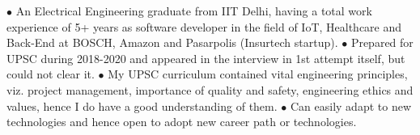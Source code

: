 \documentclass[9pt]{developercv} %
\begin{document}
\vspace{0.5cm}



\begin{minipage}[t]{0.6\textwidth} %
	\vspace{-\baselineskip} %
	
	 $\bullet$ An Electrical Engineering graduate from IIT Delhi, having a total work experience of 5+ years as software developer in the field of IoT, Healthcare and Back-End at BOSCH, Amazon and Pasarpolis (Insurtech startup). $\bullet$ Prepared for UPSC during 2018-2020 and appeared in the interview in 1st attempt itself, but could not clear it. $\bullet$ My UPSC curriculum contained vital engineering principles, viz. project management, importance of quality and safety, engineering ethics and values, hence I do have a good understanding of them. $\bullet$ Can easily adapt to new technologies and hence open to adopt new career path or technologies.\\ %
\end{minipage}
\hfill %
\begin{minipage}[t]{0.35\textwidth} %
	\vspace{-\baselineskip} %
	\begin{barchart}{4} %
	\end{barchart}
\end{minipage}



\end{document}
